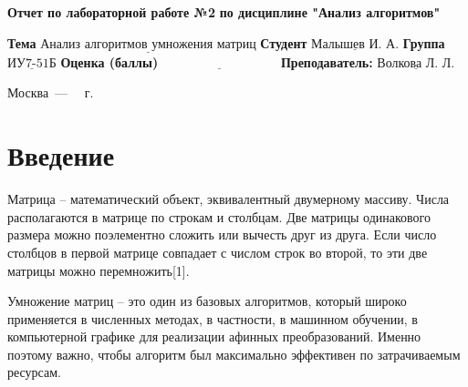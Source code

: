 \documentclass[12pt]{report}
\begin{document}
\begin{titlepage}
	
	\begin{center}
		\noindent\begin{minipage}{1.3\textwidth}\centering
			\Large\textbf{  Отчет по лабораторной работе №2}\newline
			\textbf{по дисциплине "Анализ алгоритмов"}\newline\newline
		\end{minipage}
	\end{center}
	
	\noindent\textbf{Тема} $\underline{\text{Анализ алгоритмов умножения матриц}}$\newline\newline
	\noindent\textbf{Студент} $\underline{\text{Малышев И. А.}}$\newline\newline
	\noindent\textbf{Группа} $\underline{\text{ИУ7-51Б}}$\newline\newline
	\noindent\textbf{Оценка (баллы)} $\underline{\text{~~~~~~~~~~~~~~~~~~~~~~~~~~~}}$\newline\newline
	\noindent\textbf{Преподаватель: } $\underline{\text{Волкова Л. Л.}}$\newline\newline\newline
	
	\begin{center}
		\vfill
		Москва~---~\the\year
		~г.
	\end{center}
\end{titlepage}


\renewcommand{\contentsname}{Содержание}
\tableofcontents
  
\newpage
\chapter*{Введение}

Матрица -- математический объект, эквивалентный двумерному массиву. Числа располагаются в матрице по строкам и столбцам. Две матрицы одинакового размера можно поэлементно сложить или вычесть друг из друга. Если число столбцов в первой матрице совпадает с числом строк во второй, то эти две матрицы можно перемножить[1].

Умножение матриц -- это один из базовых алгоритмов, который широко применяется в численных методах, в частности, в машинном обучении, в компьютерной графике для реализации афинных преобразований. Именно поэтому важно, чтобы алгоритм был максимально эффективен по затрачиваемым ресурсам. 
\end{document}
